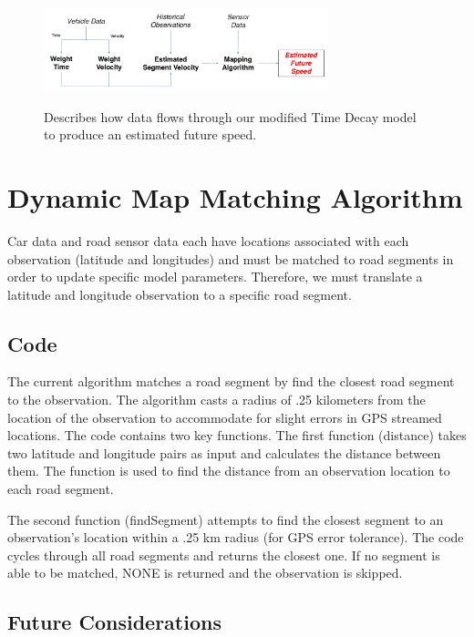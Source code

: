 \documentclass{vldb}
\begin{document}
\begin{figure}
\centering
\includegraphics[width=3.25in,height=1.25in]{TimeDecay}
\caption{Describes how data flows through our modified Time Decay model to produce an estimated future speed.}
\label{fig:networkdiagram}
\end{figure}

\section {Dynamic Map Matching Algorithm}
Car data and road sensor data each have locations associated with each observation (latitude and longitudes) and must be matched to road segments in order to update specific model parameters. Therefore, we must translate a latitude and longitude observation to a specific road segment. 

\subsection{Code}
The current algorithm matches a road segment by find the closest road segment to the observation. The algorithm casts a radius of .25 kilometers from the location of the observation to accommodate for slight errors in GPS streamed locations. The code contains two key functions. The first function (distance) takes two latitude and longitude pairs as input and calculates the distance between them. The function is used to find the distance from an observation location to each road segment. 



The second function (findSegment) attempts to find the closest segment to an observation’s location within a .25 km radius (for GPS error tolerance). The code cycles through all road segments and returns the closest one. If no segment is able to be matched, NONE is returned and the observation is skipped. 



\subsection{Future Considerations}
\end{document}
